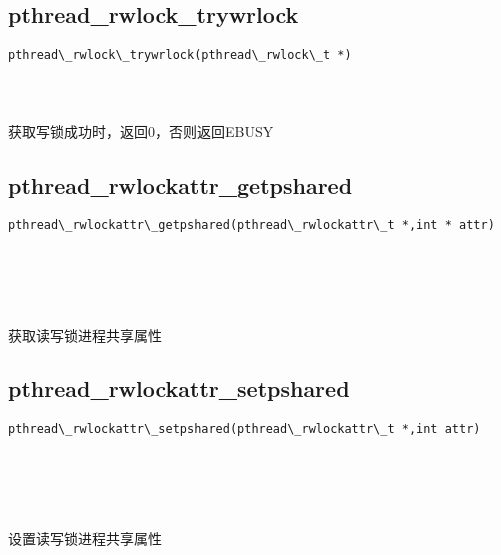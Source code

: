 \documentclass[10pt,a4paper]{article}
\begin{document}
\subsection{pthread\_rwlock\_trywrlock}
\begin{spacing}{2.0}
\lstset{language=C,numbers=none}
\begin{lstlisting}
pthread\_rwlock\_trywrlock(pthread\_rwlock\_t *)
\end{lstlisting}
{\large\color[rgb]{0.2,0.4,0.6}{*:}}
\paragraph{ \ \ }获取写锁成功时，返回0，否则返回EBUSY
\end{spacing}

\subsection{pthread\_rwlockattr\_getpshared}
\begin{spacing}{2.0}
\lstset{language=C,numbers=none}
\begin{lstlisting}
pthread\_rwlockattr\_getpshared(pthread\_rwlockattr\_t *,int * attr)
\end{lstlisting}
{\large\color[rgb]{0.2,0.4,0.6}{*:}} \\
{\large\color[rgb]{0.2,0.4,0.6}{attr:}}
\paragraph{ \ \ }获取读写锁进程共享属性
\end{spacing}

\subsection{pthread\_rwlockattr\_setpshared}
\begin{spacing}{2.0}
\lstset{language=C,numbers=none}
\begin{lstlisting}
pthread\_rwlockattr\_setpshared(pthread\_rwlockattr\_t *,int attr)
\end{lstlisting}
{\large\color[rgb]{0.2,0.4,0.6}{*:}} \\
{\large\color[rgb]{0.2,0.4,0.6}{attr:}}
\paragraph{ \ \ }设置读写锁进程共享属性
\end{spacing}
\end{document}
